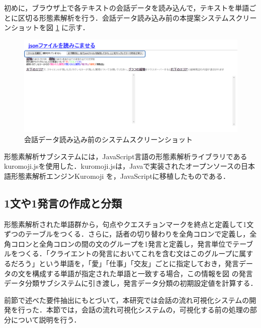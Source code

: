 \documentclass[shuuron]{kuee}
\begin{document}
初めに，ブラウザ上で各テキストの会話データを読み込んで，テキストを単語ごとに区切る形態素解析を行う．会話データ読み込み前の本提案システムスクリーンショットを図
\ref{fig:yomikomimae2}
に示す．
\begin{figure}
  \begin{center}
    \includegraphics[width=\linewidth]{yomikomimae2.png}
  \end{center}
  \caption{会話データ読み込み前のシステムスクリーンショット}
  \label{fig:yomikomimae2}
\end{figure}
形態素解析サブシステムには，JavaScript言語の形態素解析ライブラリであるkuromoji.js\cite{kuromojijs}を使用した．kuromoji.jsは，Javaで実装されたオープンソースの日本語形態素解析エンジンKuromoji
を，JavaScriptに移植したものである．

\subsection{1文や1発言の作成と分類}%
形態素解析された単語群から，句点やクエスチョンマークを終点と定義して1文ずつのテーブルをつくる．さらに，話者の切り替わりを全角コロンで定義し，全角コロンと全角コロンの間の文のグループを1発言と定義し，発言単位でテーブルをつくる．「クライエントの発言においてこれを含む文はこのグループに属するだろう」という単語を，「愛」「仕事」「交友」ごとに指定しておき，発言データの文を構成する単語が指定された単語と一致する場合，この情報を図
の発言データ分類サブシステムに引き渡し，発言データ分類の初期設定値を計算する．


前節で述べた要件抽出にもとづいて，本研究では会話の流れ可視化システムの開発を行った．本節では，会話の流れ可視化システムの，可視化する前の処理の部分について説明を行う．
\end{document}
